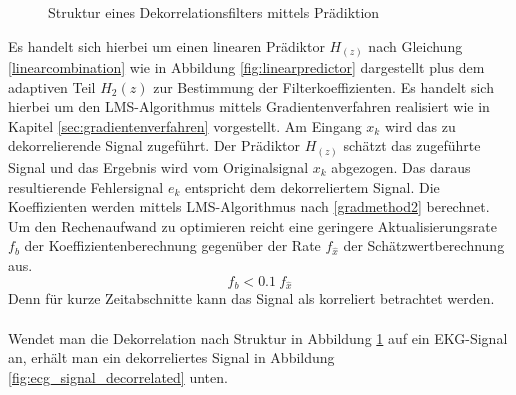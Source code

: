 \documentclass[
    10pt, %
    DIV12,
    english, %
    a5paper, %
    twoside, %
    titlepage, %
    parskip=half, %
    headings=small, %
    listof=totoc, %
    bibliography=totoc, %
    index=totoc, %
    captions=tableheading, %
    final %
]{scrbook}
\begin{document}
\begin{figure}[H]
\caption{Struktur eines Dekorrelationsfilters mittels Prädiktion}
\label{fig:decorrelationfilter}
\end{figure}
\noindent
Es handelt sich hierbei um einen linearen Prädiktor $H_(z)$ nach Gleichung \eqref{linearcombination} wie in Abbildung \ref{fig:linearpredictor} dargestellt plus dem adaptiven Teil $H_2(z)$ zur Bestimmung der Filterkoeffizienten. Es handelt sich hierbei um den LMS-Algorithmus mittels Gradientenverfahren realisiert wie in Kapitel \ref{sec:gradientenverfahren} vorgestellt.
Am Eingang $x_k$ wird das zu dekorrelierende Signal zugeführt. Der Prädiktor $H_(z)$ schätzt das zugeführte Signal und das Ergebnis wird vom Originalsignal $x_k$ abgezogen. Das daraus 
resultierende Fehlersignal $e_k$ entspricht dem dekorreliertem Signal. Die Koeffizienten werden mittels LMS-Algorithmus nach \eqref{gradmethod2} berechnet. Um den Rechenaufwand zu optimieren reicht eine geringere Aktualisierungsrate $f_b$ der Koeffizientenberechnung gegenüber der Rate $f_{\hat{x}}$ der Schätzwertberechnung aus. 
\begin{equation}\label{decorrate}
f_b<0.1\:f_{\hat{x}}
\end{equation}
Denn für kurze Zeitabschnitte kann das Signal als korreliert betrachtet werden. \\\\
Wendet man die Dekorrelation nach Struktur in Abbildung \ref{fig:decorrelationfilter} auf ein EKG-Signal an, erhält man ein dekorreliertes Signal in Abbildung \ref{fig:ecg_signal_decorrelated} unten.
\end{document}
